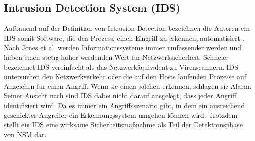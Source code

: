 \subsection{Intrusion Detection System (IDS)}
Aufbauend auf der Definition von Intrusion Detection bezeichnen die Autoren ein IDS somit Software, die den Prozess, einen Eingriff zu erkennen, automatisiert \cite{scarfone2007guide}.
Nach Jones et al. \cite{jones_computer_nodate} werden Informationssysteme immer umfassender werden und haben einen stetig höher werdenden Wert für Netzwerksicherheit. 
Schneier \cite{schneier_managed_2001} bezeichnet IDS vereinfacht als das Netzwerkäquivalent zu Virenscannern. IDS untersuchen den Netzwerkverkehr oder die auf den Hosts laufenden Prozesse auf Anzeichen für einen Angriff. Wenn sie einen solchen erkennen, schlagen sie Alarm. Seiner Ansicht nach sind IDS dabei nicht darauf ausgelegt, dass jeder Angriff identifiziert wird. Da es immer ein Angriffsszenario gibt, in dem ein ausreichend geschickter Angreifer ein Erkennungssystem umgehen können wird. Trotzdem stellt ein IDS eine wirksame Sicherheitsmaßnahme als Teil der Detektionsphase von NSM dar.

